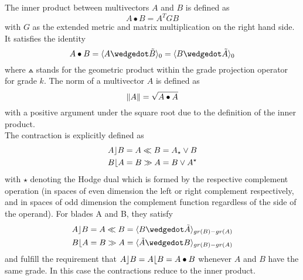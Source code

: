 The inner product between multivectors $A$ and $B$ is defined as
\begin{equation}
    A \bullet B = A^{T} G B
    \label{eg:inner_product_metric}
\end{equation}
with $G$ as the extended metric and matrix multiplication on the right hand side. It
satisfies the identity
\begin{equation}
    A \bullet B  = \grprj{A \wedgedot \tilde{B}}{0} = \grprj{ B \wedgedot \tilde{A} }{0}
    \label{eq:inner_product_link_to_gpr}
\end{equation}
where $\wedgedot$ stands for the geometric product within the grade projection operator
 for grade $k$. The norm of a multivector $A$ is defined as
\begin{equation}
    \left \lVert {A} \right \rVert = \sqrt{A \bullet A}
    \label{eq:norm_mv}
\end{equation}
with a positive argument under the square root due to the definition of the inner product.
\\

The contraction is explicitly defined as
\begin{subequations}
    \begin{align}
    A \rfloor B & = A \ll B = A_{\star} \vee B
    \label{eq:lcontr} \\
    B \lfloor A & = B \gg A = B \vee A^{\star}
    \label{eq:rcontr}
    \end{align}
\end{subequations}
with $\star$ denoting the Hodge dual which is formed by the respective complement
operation (in spaces of even dimension the left or right complement respectively, and in
spaces of odd dimension the complement function regardless of the side of the operand).
For blades A and B, they satisfy
\begin{subequations}
    \begin{align}
    A \lcontr B &  = A \ll B = \grprj{B \wedgedot \tilde{A}}{gr(B)-gr(A)}
    \label{eq:lcontr_gpr} \\
    B \rcontr A & = B \gg A = \grprj{\tilde{A} \wedgedot B}{gr(B)-gr(A)}
    \label{eq:rcontr_gpr}
    \end{align}
\end{subequations}
and fulfill the requirement that $A \rfloor B = A \lfloor B = A \bullet B$ whenever $A$
and $B$ have the same grade. In this case the contractions reduce to the inner product. \\


